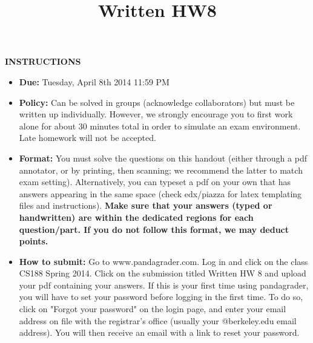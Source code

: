 \documentclass[twoside]{article}
\title{Written HW8}
\begin{document}
\thispagestyle{empty}
\maketitle


\smallskip
\smallskip
\textbf{INSTRUCTIONS}

\begin{itemize}
\item \textbf{Due:} Tuesday, April 8th 2014 11:59 PM
\item \textbf{Policy:} Can be solved in groups (acknowledge collaborators) but must
be written up individually. However,
we strongly encourage you to first work alone for about 30 minutes total in order to simulate an exam environment.  Late homework
will not be accepted.
\item \textbf{Format:}
You must solve the questions on this handout (either through a pdf annotator, or by printing, then scanning; we recommend the latter to match exam setting). Alternatively, you can typeset a pdf on your own that has answers appearing in the same space (check edx/piazza for latex templating files and instructions).
\textbf{Make sure that your answers (typed or handwritten) are within the
dedicated regions for each question/part.  If you do not follow this format, we may deduct points.}

\item \textbf{How to submit:}  Go to www.pandagrader.com. Log in and click on the
class CS188 Spring 2014. Click
on the submission titled Written HW 8 and upload your pdf containing your answers. If this is your first time using
pandagrader, you will have to set your password before logging in the
first time.  To do so, click on "Forgot your password" on the login
page, and enter your email address on file with the registrar's office
(usually your @berkeley.edu email address). You will then receive an
email with a link to reset your password.

\end{itemize}
\end{document}
